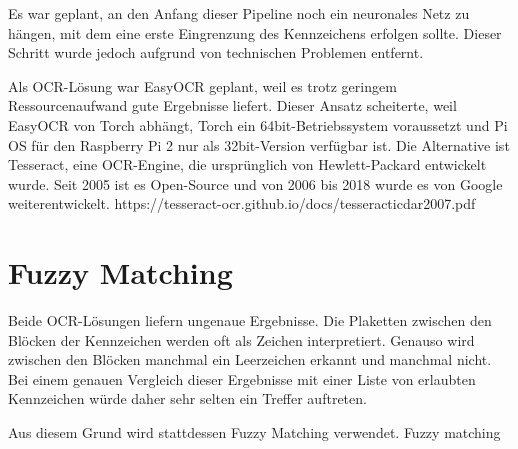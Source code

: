 Es war geplant, an den Anfang dieser Pipeline noch ein neuronales Netz zu hängen, mit dem eine erste Eingrenzung des Kennzeichens erfolgen sollte. Dieser Schritt wurde jedoch aufgrund von technischen Problemen entfernt.

Als OCR-Lösung war EasyOCR geplant, weil es trotz geringem Ressourcenaufwand gute Ergebnisse liefert. Dieser Ansatz scheiterte, weil EasyOCR von Torch abhängt, Torch ein 64bit-Betriebssystem voraussetzt und Pi OS für den Raspberry Pi 2 nur als 32bit-Version verfügbar ist.
Die Alternative ist Tesseract, eine OCR-Engine, die ursprünglich von Hewlett-Packard entwickelt wurde. Seit 2005 ist es Open-Source und von 2006 bis 2018 wurde es von Google weiterentwickelt. https://tesseract-ocr.github.io/docs/tesseracticdar2007.pdf

\chapter{Fuzzy Matching}
Beide OCR-Lösungen liefern ungenaue Ergebnisse. Die Plaketten zwischen den Blöcken der Kennzeichen werden oft als Zeichen interpretiert. Genauso wird zwischen den Blöcken manchmal ein Leerzeichen erkannt und manchmal nicht.
Bei einem genauen Vergleich dieser Ergebnisse mit einer Liste von erlaubten Kennzeichen würde daher sehr selten ein Treffer auftreten.

Aus diesem Grund wird stattdessen Fuzzy Matching verwendet. Fuzzy matching 